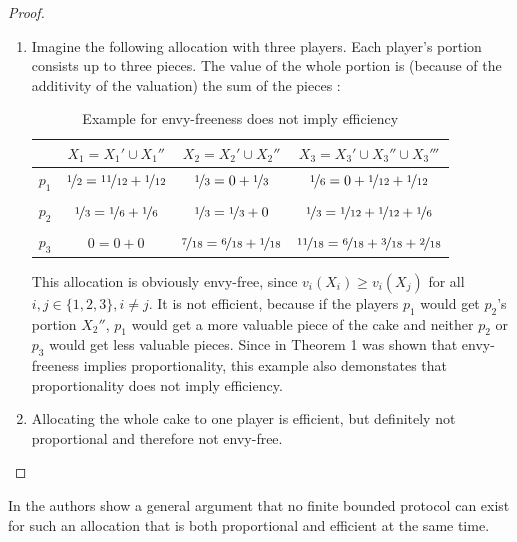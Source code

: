 \begin{proof}
\textcolor{white}{x}
	\begin{enumerate}
\item Imagine the following allocation with three players. Each player's portion consists up to three pieces. The value of the whole portion is (because of the additivity of the valuation) the sum of the pieces :
		\begin{table}[htb]
		\centering
		\renewcommand{\arraystretch}{1.2}
		\begin{tabular}{c|ccc}
		& $X_1 =X_1'\cup X_1''$& $X_2 =X_2'\cup X_2''$& $X_3 =X_3'\cup X_3''\cup X_3'''$\\
		\hline
		$p_1$ & \textcolor{blue}{$\nicefrac{1}{2}=\nicefrac{11}{12}+\nicefrac{1}{12}$} & $\nicefrac{1}{3}=0+\nicefrac{1}{3}$ & $\nicefrac{1}{6}=0+\nicefrac{1}{12}+\nicefrac{1}{12}$\\ \\
  $p_2$ & $\nicefrac{1}{3}=\nicefrac{1}{6}+\nicefrac{1}{6}$ & \textcolor{blue}{$\nicefrac{1}{3}=\nicefrac{1}{3}+0$} & $\nicefrac{1}{3}=\nicefrac{1}{12}+\nicefrac{1}{12}+\nicefrac{1}{6}$\\ \\
  $p_3$ & $0=0+0$ & $\nicefrac{7}{18}=\nicefrac{6}{18}+\nicefrac{1}{18}$ & \textcolor{blue}{$\nicefrac{11}{18}=\nicefrac{6}{18}+\nicefrac{3}{18}+\nicefrac{2}{18}$}
 		\end{tabular}	 
\caption{Example for envy-freeness does not imply efficiency}\label{Table3}
\end{table}
\newline This allocation is obviously envy-free, since $v_i(X_i) \geq v_i(X_j)$ for all $i, j \in \{1,2,3\}, i \neq j$. It is not efficient, because if the players $p_1$ would get $p_2$'s portion $X_2''$, $p_1$ would get a more valuable piece of the cake and neither $p_2$ or $p_3$ would get less valuable pieces. Since in Theorem 1 was shown that envy-freeness implies proportionality, this example also demonstates that proportionality does not imply efficiency.
		\item Allocating the whole cake to one player is efficient, but definitely not proportional and therefore not envy-free.
	\end{enumerate}
\end{proof}
In \cite{brams2} the authors show a general argument that no finite bounded protocol can exist for such an allocation that is both proportional and efficient at the same time.
